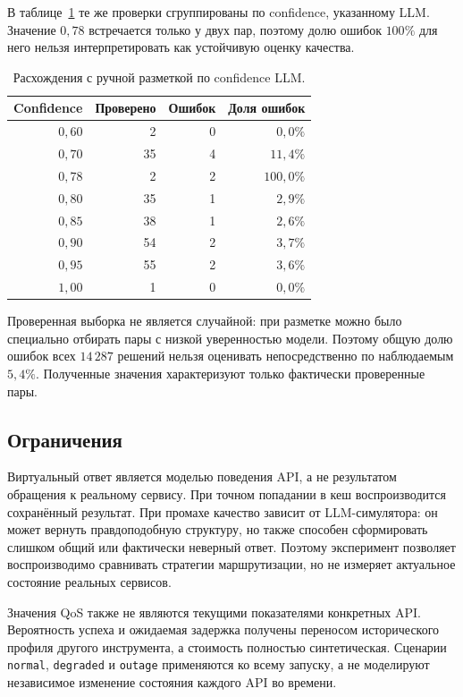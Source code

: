 \documentclass[12pt,a4paper]{article}
\begin{document}
В таблице~\ref{tab:review-by-confidence} те же проверки сгруппированы по
confidence, указанному LLM. Значение $0{,}78$ встречается только у двух пар,
поэтому долю ошибок $100\%$ для него нельзя интерпретировать как устойчивую
оценку качества.

\begin{table}[ht]
    \centering
    \begin{tabular}{rrrr}
        \toprule
        Confidence & Проверено & Ошибок & Доля ошибок \\
        \midrule
        $0{,}60$ & 2  & 0 & $0{,}0\%$ \\
        $0{,}70$ & 35 & 4 & $11{,}4\%$ \\
        $0{,}78$ & 2  & 2 & $100{,}0\%$ \\
        $0{,}80$ & 35 & 1 & $2{,}9\%$ \\
        $0{,}85$ & 38 & 1 & $2{,}6\%$ \\
        $0{,}90$ & 54 & 2 & $3{,}7\%$ \\
        $0{,}95$ & 55 & 2 & $3{,}6\%$ \\
        $1{,}00$ & 1  & 0 & $0{,}0\%$ \\
        \bottomrule
    \end{tabular}
    \caption{Расхождения с ручной разметкой по confidence LLM.}
    \label{tab:review-by-confidence}
\end{table}

Проверенная выборка не является случайной: при разметке можно было специально
отбирать пары с низкой уверенностью модели. Поэтому общую долю ошибок всех
$14\,287$ решений нельзя оценивать непосредственно по наблюдаемым $5{,}4\%$.
Полученные значения характеризуют только фактически проверенные пары.

\subsection{Ограничения}

Виртуальный ответ является моделью поведения API, а не результатом обращения к
реальному сервису. При точном попадании в кеш воспроизводится сохранённый
результат. При промахе качество зависит от LLM-симулятора: он может вернуть
правдоподобную структуру, но также способен сформировать слишком общий или
фактически неверный ответ. Поэтому эксперимент позволяет воспроизводимо
сравнивать стратегии маршрутизации, но не измеряет актуальное состояние
реальных сервисов.

Значения QoS также не являются текущими показателями конкретных API.
Вероятность успеха и ожидаемая задержка получены переносом исторического
профиля другого инструмента, а стоимость полностью синтетическая. Сценарии
\texttt{normal}, \texttt{degraded} и \texttt{outage} применяются ко всему
запуску, а не моделируют независимое изменение состояния каждого API во
времени.
\end{document}
